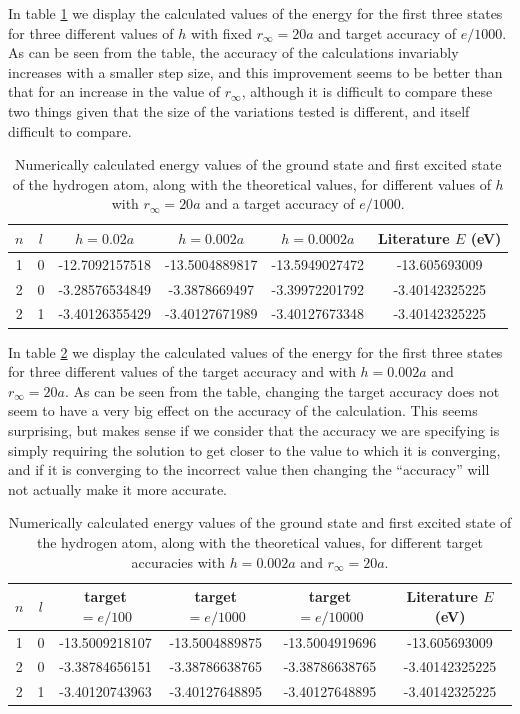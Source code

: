 \documentclass{article}
\begin{document}
In table \ref{tab:2b_iii} we display the calculated values of the energy for the first three states for three different values of $h$ with fixed $r_\infty=20a$ and target accuracy of $e/1000$. As can be seen from the table, the accuracy of the calculations invariably increases with a smaller step size, and this improvement seems to be better than that for an increase in the value of $r_\infty$, although it is difficult to compare these two things given that the size of the variations tested is different, and itself difficult to compare. 

\begin{table}[H]
	\centering
	\caption{Numerically calculated energy values of the ground state and first excited state of the hydrogen atom, along with the theoretical values, for different values of $h$ with $r_\infty=20a$ and a target accuracy of $e/1000$.}
	\label{tab:2b_iii}
	\begin{tabular}{c|c|c|c|c|c}
		$n$ & $l$ & $h = 0.02a$ & $h = 0.002a$ & $h = 0.0002a$ & Literature $E$ (eV) \\
		\hline
		1 & 0 & -12.7092157518 & -13.5004889817 & -13.5949027472 & -13.605693009 \\
		2 & 0 & -3.28576534849 & -3.3878669497 & -3.39972201792 & -3.40142325225 \\
		2 & 1 & -3.40126355429 & -3.40127671989 & -3.40127673348 & -3.40142325225 \\
	\end{tabular}
\end{table}

In table \ref{tab:2b_iiii} we display the calculated values of the energy for the first three states for three different values of the target accuracy and with $h=0.002a$ and $r_\infty=20a$. As can be seen from the table, changing the target accuracy does not seem to have a very big effect on the accuracy of the calculation. This seems surprising, but makes sense if we consider that the accuracy we are specifying is simply requiring the solution to get closer to the value to which it is converging, and if it is converging to the incorrect value then changing the ``accuracy'' will not actually make it more accurate.

\begin{table}[H]
	\centering
	\caption{Numerically calculated energy values of the ground state and first excited state of the hydrogen atom, along with the theoretical values, for different target accuracies with $h=0.002a$ and $r_\infty=20a$.}
	\label{tab:2b_iiii}
	\begin{tabular}{c|c|c|c|c|c}
		$n$ & $l$ & target$=e/100$ & target$=e/1000$ & target$=e/10000$ & Literature $E$ (eV) \\
		\hline
		1 & 0 & -13.5009218107 & -13.5004889875 & -13.5004919696 & -13.605693009 \\
		2 & 0 & -3.38784656151 & -3.38786638765 & -3.38786638765 & -3.40142325225 \\
		2 & 1 & -3.40120743963 & -3.40127648895 & -3.40127648895 & -3.40142325225 \\
	\end{tabular}
\end{table}
\end{document}
